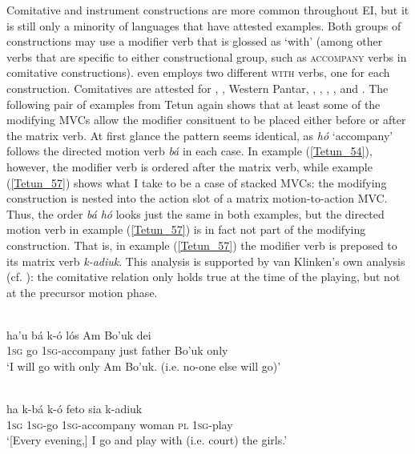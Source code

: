 \largerpage[1]
Comitative and instrument constructions are more common throughout EI, but it is still only a minority of languages that have attested examples. Both groups of constructions may use a modifier verb that is glossed as `with' (among other verbs that are specific to either constructional group, such as \textsc{accompany} verbs in comitative constructions).  even employs two different \textsc{with} verbs, one for each construction. Comitatives are attested for , , Western Pantar, , , , , and . The following pair of examples from Tetun again shows that at least some of the modifying MVCs allow the modifier consituent to be placed either before or after the matrix verb. At first glance the pattern seems identical, as \textit{hó} `accompany' follows the directed motion verb \textit{bá} in each case. In example (\ref{Tetun_54}), however, the modifier verb is ordered after the matrix verb, while example (\ref{Tetun_57}) shows what I take to be a case of stacked MVCs: the modifying construction is nested into the action slot of a matrix motion-to-action MVC. Thus, the order \textit{bá} \textit{hó} looks just the same in both examples, but the directed motion verb in example (\ref{Tetun_57}) is in fact not part of the modifying construction. That is, in example (\ref{Tetun_57}) the modifier verb is preposed to its matrix verb \textit{k-adiuk}. This analysis is supported by van Klinken's own analysis (cf. \citealt[272]{vanklinken1999grammar}): the comitative relation only holds true at the time of the playing, but not at the precursor motion phase.

\ea \label{Tetun_54}
\\
\gll ha'u bá k-ó lós Am Bo'uk dei \\
1\textsc{sg} go 1\textsc{sg}-accompany just father Bo'uk only \\
\glft `I will go with only Am Bo'uk. (i.e. no-one else will go)'\\ 
\z

\ea \label{Tetun_57}
\\
\gll ha k-bá k-ó feto sia k-adiuk \\
1\textsc{sg} 1\textsc{sg}-go 1\textsc{sg}-accompany woman \textsc{pl} 1\textsc{sg}-play \\
\glft `[Every evening,] I go and play with (i.e. court) the girls.'\\ 
\z

